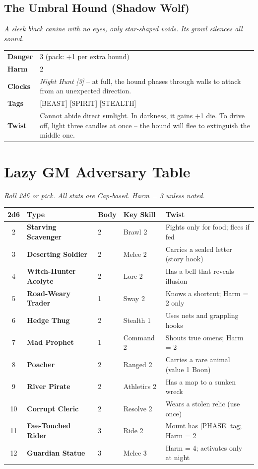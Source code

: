 \documentclass[10pt,twocolumn]{article}
\newcommand{\kw}[1]{\textbf{#1}}     %
\begin{document}
\subsection*{The Umbral Hound (Shadow Wolf)}
\emph{A sleek black canine with no eyes, only star-shaped voids. Its growl silences all sound.}
\begin{tabular}{@{}ll}
\toprule
\kw{Danger} & 3 (pack: +1 per extra hound) \\
\kw{Harm}   & 2 \\
\kw{Clocks} & \textit{Night Hunt [3]} -- at full, the hound phases through walls to attack from an unexpected direction. \\
\kw{Tags}   & [BEAST] [SPIRIT] [STEALTH] \\
\kw{Twist}  & Cannot abide direct sunlight. In darkness, it gains +1 die. To drive off, light three candles at once -- the hound will flee to extinguish the middle one. \\
\bottomrule
\end{tabular}

\section*{Lazy GM Adversary Table}
\textit{Roll 2d6 or pick. All stats are Cap-based. Harm = 3 unless noted.}

\vspace{0.2in}
\begin{tabular}{@{}cllll}
\toprule
2d6 & \kw{Type} & \kw{Body} & \kw{Key Skill} & \kw{Twist} \\
\midrule
2 & \textbf{Starving Scavenger} & 2 & Brawl 2 & Fights only for food; flees if fed \\
3 & \textbf{Deserting Soldier} & 2 & Melee 2 & Carries a sealed letter (story hook) \\
4 & \textbf{Witch-Hunter Acolyte} & 2 & Lore 2 & Has a bell that reveals illusion \\
5 & \textbf{Road-Weary Trader} & 1 & Sway 2 & Knows a shortcut; Harm = 2 only \\
6 & \textbf{Hedge Thug} & 2 & Stealth 1 & Uses nets and grappling hooks \\
7 & \textbf{Mad Prophet} & 1 & Command 2 & Shouts true omens; Harm = 2 \\
8 & \textbf{Poacher} & 2 & Ranged 2 & Carries a rare animal (value 1 Boon) \\
9 & \textbf{River Pirate} & 2 & Athletics 2 & Has a map to a sunken wreck \\
10 & \textbf{Corrupt Cleric} & 2 & Resolve 2 & Wears a stolen relic (use once) \\
11 & \textbf{Fae-Touched Rider} & 3 & Ride 2 & Mount has [PHASE] tag; Harm = 2 \\
12 & \textbf{Guardian Statue} & 3 & Melee 3 & Harm = 4; activates only at night \\
\bottomrule
\end{tabular}
\end{document}
